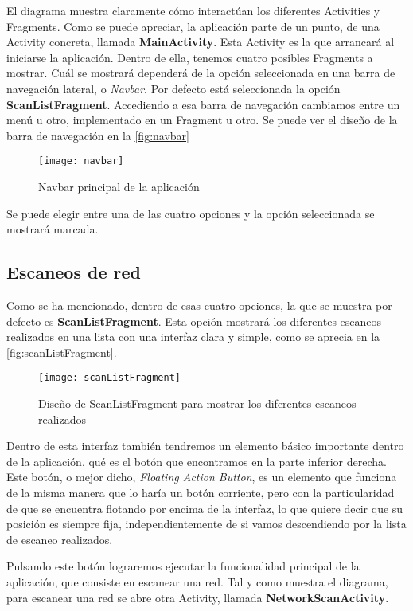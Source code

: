 El diagrama muestra claramente cómo interactúan los diferentes Activities y Fragments.  Como se puede apreciar, la aplicación parte de un punto, de una Activity concreta, llamada \textbf{MainActivity}. Esta Activity es la que arrancará al iniciarse la aplicación. Dentro de ella, tenemos cuatro posibles Fragments a mostrar. Cuál se mostrará dependerá de la opción seleccionada en una barra de navegación lateral, o \textit{Navbar}. Por defecto está seleccionada la opción \textbf{ScanListFragment}. Accediendo a esa barra de navegación cambiamos entre un menú u otro, implementado en un Fragment u otro. Se puede ver el diseño de la barra de navegación en la \autoref{fig:navbar}

\begin{figure}[H]
	\centering
	\texttt{[image: navbar]}
	\caption{Navbar principal de la aplicación}
	\label{fig:navbar}
\end{figure}

Se puede elegir entre una de las cuatro opciones y la opción seleccionada se mostrará marcada.

\subsection{Escaneos de red}

Como se ha mencionado, dentro de esas cuatro opciones, la que se muestra por defecto es \textbf{ScanListFragment}. Esta opción mostrará los diferentes escaneos realizados en una lista con una interfaz clara y simple, como se aprecia en la \autoref{fig:scanListFragment}.

\begin{figure}[H]
	\centering
	\texttt{[image: scanListFragment]}
	\caption{Diseño de ScanListFragment para mostrar los diferentes escaneos realizados}
	\label{fig:scanListFragment}
\end{figure}

Dentro de esta interfaz también tendremos un elemento básico importante dentro de la aplicación, qué es el botón que encontramos en la parte inferior derecha. Este botón, o mejor dicho, \textit{Floating Action Button}, es un elemento que funciona de la misma manera que lo haría un botón corriente, pero con la particularidad de que se encuentra flotando por encima de la interfaz, lo que quiere decir que su posición es siempre fija, independientemente de si vamos descendiendo por la lista de escaneo realizados.

Pulsando este botón lograremos ejecutar la funcionalidad principal de la aplicación, que consiste en escanear una red. Tal y como muestra el diagrama, para escanear una red se abre otra Activity, llamada \textbf{NetworkScanActivity}.

